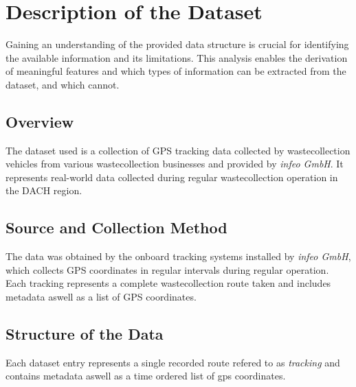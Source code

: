\documentclass[a4paper,12pt,twoside]{scrreprt}
\begin{document}
\section{Description of the Dataset}
Gaining an understanding of the provided data structure is crucial for
identifying the available information and its limitations.
This analysis enables the derivation of meaningful features and which types of
information can be extracted from the dataset, and which cannot.

\subsection{Overview}
The dataset used is a collection of GPS tracking data collected by
wastecollection vehicles from various wastecollection businesses and provided
by \textit{infeo GmbH}. It represents real-world data
collected during regular wastecollection operation in the DACH region.

\subsection{Source and Collection Method}
The data was obtained by the onboard tracking systems installed by
\textit{infeo GmbH},
which collects GPS coordinates in regular intervals during regular operation.
Each tracking represents a complete wastecollection route taken and includes
metadata aswell as a list of GPS coordinates.

\subsection{Structure of the Data}
Each dataset entry represents a single recorded route refered to as
\textit{tracking} and contains metadata aswell as a time ordered list of gps
coordinates.
\end{document}
